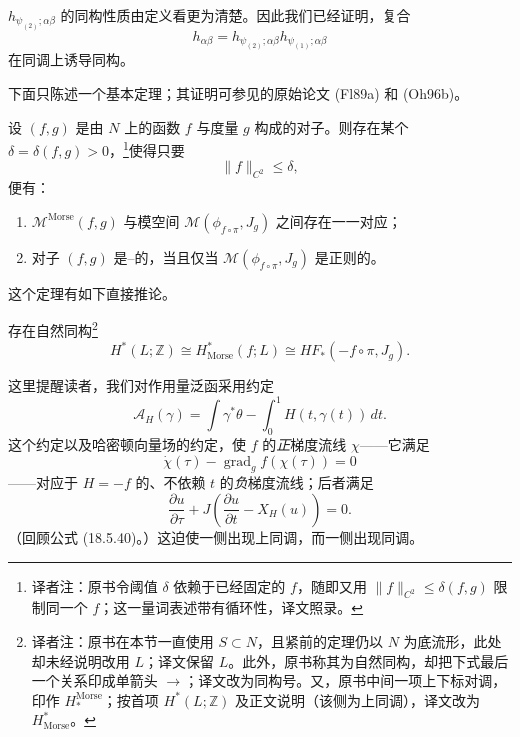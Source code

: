 $h_{\psi_{(2)};\alpha\beta}$ 的同构性质由定义看更为清楚。因此我们已经证明，复合
\[
  h_{\alpha\beta}
  =h_{\psi_{(2)};\alpha\beta}h_{\psi_{(1)};\alpha\beta}
\]
在同调上诱导同构。

下面只陈述一个基本定理；其证明可参见\personFloer{}的原始论文 (Fl89a) 和 (Oh96b)。

\begin{theorem}
\label{thm:morse-floer-moduli-correspondence}
设 $(f,g)$ 是由 $N$ 上的\personMorse{}函数 $f$ 与\personRiemann{}度量 $g$ 构成的对子。则存在某个 $\delta=\delta(f,g)>0$，\footnote{译者注：原书令阈值 $\delta$ 依赖于已经固定的 $f$，随即又用 $\lVert f\rVert_{C^2}\le\delta(f,g)$ 限制同一个 $f$；这一量词表述带有循环性，译文照录。}使得只要
\[
  \lVert f\rVert_{C^2}\le\delta,
\]
便有：
\begin{enumerate}[label=(\arabic*)]
  \item \termMorseModuliSpace{} $\mathcal M^{\mathrm{Morse}}(f,g)$ 与\personFloer{}模空间 $\mathcal M(\phi_{f\circ\pi},J_g)$ 之间存在一一对应；
  \item 对子 $(f,g)$ 是\personMorse{}--\personSmale{}的，当且仅当 $\mathcal M(\phi_{f\circ\pi},J_g)$ 是\personFredholm{}正则的。
\end{enumerate}
\end{theorem}

这个定理有如下直接推论。

\begin{corollary}
\label{cor:morse-floer-natural-isomorphism}
存在自然同构\footnote{译者注：原书在本节一直使用 $S\subset N$，且紧前的定理仍以 $N$ 为底流形，此处却未经说明改用 $L$；译文保留 $L$。此外，原书称其为自然同构，却把下式最后一个关系印成单箭头 $\to$；译文改为同构号。又，原书中间一项上下标对调，印作 $H^{\mathrm{Morse}}_*$；按首项 $H^*(L;\mathbb Z)$ 及正文说明（该侧为上同调），译文改为 $H^*_{\mathrm{Morse}}$。}
\[
  H^*(L;\mathbb Z)
  \cong H^*_{\mathrm{Morse}}(f;L)
  \cong HF_*(-f\circ\pi,J_g).
\]
\end{corollary}

这里提醒读者，我们对作用量泛函采用约定
\[
  \mathcal A_H(\gamma)
  =\int\gamma^*\theta-
   \int_0^1H(t,\gamma(t))\,dt.
\]
这个约定以及哈密顿向量场的约定，使 $f$ 的\emph{正}\personMorse{}梯度流线 $\chi$——它满足
\[
  \dot\chi(\tau)-\operatorname{grad}_g f(\chi(\tau))=0
\]
——对应于 $H=-f$ 的、不依赖 $t$ 的\emph{负}\personFloer{}梯度流线；后者满足
\[
  \frac{\partial u}{\partial\tau}
  +J\left(\frac{\partial u}{\partial t}-X_H(u)\right)=0.
\]
（回顾公式 (18.5.40)。）这迫使\personMorse{}一侧出现上同调，而\personFloer{}一侧出现同调。
